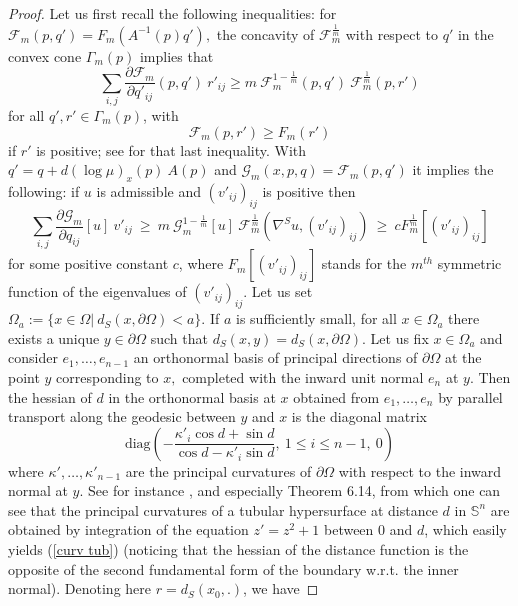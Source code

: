 \documentclass[10pt,reqno,oneside]{amsart}
\theoremstyle{definition}
\theoremstyle{remark}
\begin{document}
\begin{proof}
Let us first recall the following inequalities: for $\mathcal{F}_m(p,q')=F_m(A^{-1}(p)q'),$ the concavity of $\mathcal{F}_m^{\frac{1}{m}}$ with respect to $q'$ in the convex cone $\Gamma_m(p)$ implies that
$$\sum_{i,j}\frac{\partial\mathcal{F}_m}{\partial q'_{ij}}(p,q')\ r'_{ij}\geq m\ \mathcal{F}_m^{1-\frac{1}{m}}(p,q')\ \mathcal{F}_m^{\frac{1}{m}}(p,r')$$  
for all $q',r'\in\Gamma_m(p)$, with 
\begin{equation}\label{est C2b cal Fm geq Fm}
\mathcal{F}_m(p,r')\geq F_m(r')
\end{equation}
if $r'$ is positive; see \cite[Lemma 4.7]{Bay1} for that last inequality. With $q'=q+d(\log\mu)_x(p)\ A(p)$ and $\mathcal{G}_m(x,p,q)=\mathcal{F}_m(p,q')$ it implies the following: if $u$ is admissible and $(v'_{ij})_{ij}$ is positive then
\begin{equation}\label{sum F_muvijFmv}
\sum_{i,j}\frac{\partial \mathcal{G}_m}{\partial q_{ij}}[u]\ v'_{ij}\ \geq\ m\ \mathcal{G}_m^{1-\frac{1}{m}}[u]\ \mathcal{F}_m^{\frac{1}{m}}(\nabla^Su,(v'_{ij})_{ij})\ \geq\ cF_m^{\frac{1}{m}}[(v'_{ij})_{ij}]
\end{equation}
for some positive constant $c$, where $F_m[(v'_{ij})_{ij}]$ stands for the $m^{th}$ symmetric function of the eigenvalues of $(v'_{ij})_{ij}$. Let us set $\Omega_a:=\{x\in\Omega|\ d_S(x,\partial\Omega)<a\}.$ If $a$ is sufficiently small, for all $x\in \Omega_a$ there exists a unique $y\in\partial\Omega$ such that $d_S(x,y)=d_S(x,\partial\Omega).$ Let us fix $x\in\Omega_a$ and consider $e_1,\ldots,e_{n-1}$ an orthonormal basis of principal directions of $\partial\Omega$ at the point $y$ corresponding to $x,$ completed with the inward unit normal $e_n$ at $y.$ Then the hessian of $d$ in the orthonormal basis at $x$ obtained from $e_1,\ldots,e_n$ by parallel transport along the geodesic between $y$ and $x$ is the diagonal matrix
\begin{equation}\label{curv tub}
\mbox{diag}\left(-\frac{\kappa'_i\cos d+\sin d}{\cos d-\kappa'_i\sin d},\ 1\leq i\leq n-1,\ 0\right)
\end{equation}
where $\kappa',\ldots,\kappa'_{n-1}$ are the principal curvatures of $\partial\Omega$ with respect to the inward normal at $y.$ See for instance \cite[Chapter 6.3]{Gr}, and especially Theorem 6.14, from which one can see that the principal curvatures of a tubular hypersurface at distance $d$ in $\mathbb{S}^n$ are obtained by integration of the equation $z'=z^2+1$ between $0$ and $d$, which easily yields (\ref{curv tub}) (noticing that the hessian of the distance function is the opposite of the second fundamental form of the boundary w.r.t. the inner normal). Denoting here $r=d_S(x_0,.)$, we have 

\end{proof}
\end{document}
